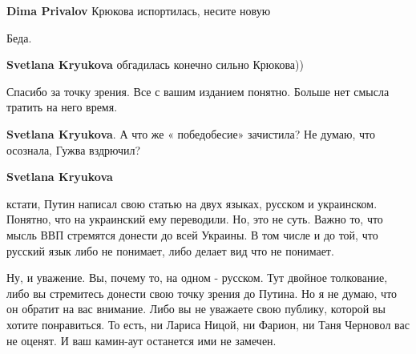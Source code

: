 \begin{itemize}
\begin{itemize}
\textbf{Dima Privalov} Крюкова испортилась, несите новую

 
Беда.

 
\textbf{Svetlana Kryukova} обгадилась конечно сильно Крюкова))

 
Спасибо за точку зрения. Все с вашим изданием понятно. Больше нет смысла тратить на него время.

 
\textbf{Svetlana Kryukova}. А что же « победобесие» зачистила? Не думаю, что осознала, Гужва вздрючил?

 
\textbf{Svetlana Kryukova} 

кстати, Путин написал свою статью на двух языках, русском и украинском.
Понятно, что на украинский ему переводили. Но, это не суть. Важно то, что мысль
ВВП стремятся донести до всей Украины. В том числе и до той, что русский язык
либо не понимает, либо делает вид что не понимает. 

Ну, и уважение. Вы, почему то, на одном - русском. Тут двойное толкование, либо
вы стремитесь донести свою точку зрения до Путина. Но я не думаю, что он
обратит на вас внимание. Либо вы не уважаете свою публику, которой вы хотите
понравиться. То есть, ни Лариса Ницой, ни Фарион, ни Таня Черновол вас не
оценят. И ваш камин-аут останется ими не замечен.


\end{itemize}
\end{itemize}
